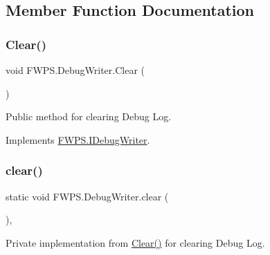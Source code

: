 \subsection{Member Function Documentation}
\mbox{\label{class_f_w_p_s_1_1_debug_writer_ab34d96db0bb866e444604b733171519c}} 
\subsubsection{\texorpdfstring{Clear()}{Clear()}}
{\footnotesize\ttfamily void F\+W\+P\+S.\+Debug\+Writer.\+Clear (\begin{DoxyParamCaption}{ }\end{DoxyParamCaption})}



Public method for clearing Debug Log. 



Implements \mbox{\hyperlink{interface_f_w_p_s_1_1_i_debug_writer_afe3fafb517c1a3ba057d6d3ed4da0285}{F\+W\+P\+S.\+I\+Debug\+Writer}}.

\mbox{\label{class_f_w_p_s_1_1_debug_writer_a95a1e4a53d8624dad174685ed12ebcb2}} 
\subsubsection{\texorpdfstring{clear()}{clear()}}
{\footnotesize\ttfamily static void F\+W\+P\+S.\+Debug\+Writer.\+clear (\begin{DoxyParamCaption}{ }\end{DoxyParamCaption})\hspace{0.3cm}{\ttfamily [static]}, {\ttfamily [private]}}



Private implementation from \mbox{\hyperlink{class_f_w_p_s_1_1_debug_writer_ab34d96db0bb866e444604b733171519c}{Clear()}} for clearing Debug Log. 

\mbox{\label{class_f_w_p_s_1_1_debug_writer_a5bcf9f0db8527f6440d749910e276998}} 
